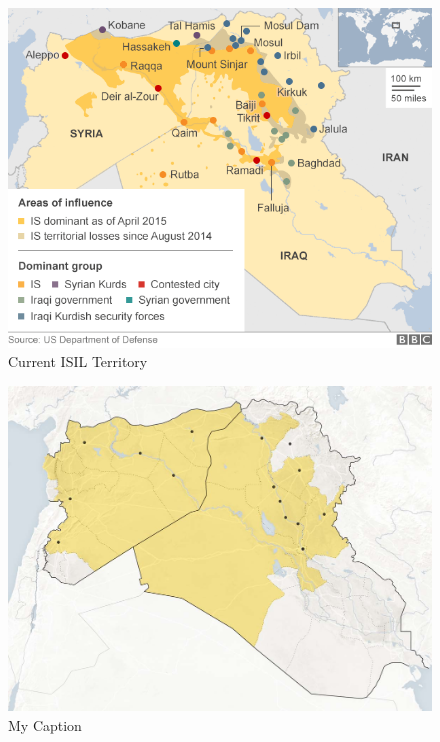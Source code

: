 \documentclass{report}
\begin{document}
\begin{figure}[h]
 \centering
 \includegraphics[trim = 0cm 0cm 0cm 0cm, clip,scale=0.6]{./figures/current_territory.png}
   \caption{Current ISIL Territory}
     \label{fig:current_territory}
\end{figure}



\begin{figure}[H]
 \centering
 \includegraphics[trim = 0cm 0cm 0cm 0cm, clip,scale=0.3]{./figures/current2.png}
   \caption{My Caption \cite{Lewis2014}}
     \label{fig:current2}
\end{figure}
\end{document}
